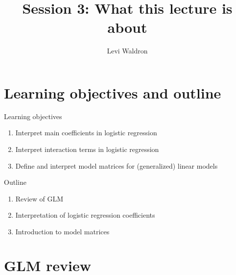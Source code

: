 \documentclass[
  ignorenonframetext,
]{beamer}
\title{Session 3: What this lecture is about}
\author{Levi Waldron}
\date{}
\institute{CUNY SPH Biostatistics 2}
\providecommand{\tightlist}{%
  \setlength{\itemsep}{0pt}\setlength{\parskip}{0pt}}
\begin{document}
\frame{\titlepage}

\hypertarget{learning-objectives-and-outline}{%
\section{Learning objectives and
outline}\label{learning-objectives-and-outline}}

\begin{frame}{Learning objectives}
\protect\hypertarget{learning-objectives}{}

\begin{enumerate}
\tightlist
\item
  Interpret main coefficients in logistic regression
\item
  Interpret interaction terms in logistic regression
\item
  Define and interpret model matrices for (generalized) linear models
\end{enumerate}

\end{frame}

\begin{frame}{Outline}
\protect\hypertarget{outline}{}

\begin{enumerate}
\tightlist
\item
  Review of GLM
\item
  Interpretation of logistic regression coefficients
\item
  Introduction to model matrices
\end{enumerate}

\end{frame}

\hypertarget{glm-review}{%
\section{GLM review}\label{glm-review}}
\end{document}
